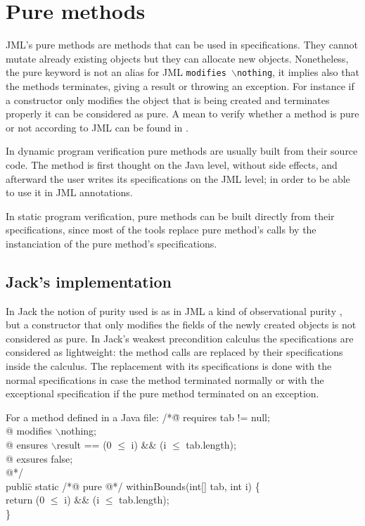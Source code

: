 \section{Pure methods}
JML's pure methods are methods that can be used in specifications.
They cannot mutate already existing objects but they can allocate new objects.
Nonetheless, the pure keyword is not an alias for JML {\tt modifies $\backslash$nothing}, 
it implies also that the methods terminates, giving a result or throwing an 
exception.
For instance if a constructor only modifies the object that is being 
created and terminates properly
it can be considered as pure.
A mean to verify whether a method is pure or not according to JML
can be found in \cite{salcianu05}. 



In dynamic program verification pure methods are usually built from their source code. 
The method is first thought on the Java level, without side effects, and afterward
the user writes its specifications on the JML level; in order to be able
to use it in JML annotations.

In static program verification,  pure methods can be built directly
from their specifications, since most of the tools replace  pure method's calls 
 by the instanciation of the pure method's specifications.


\subsection{Jack's implementation}
In Jack the notion of purity used is as in JML a kind of observational purity \cite{naumann05}, 
but a constructor that
only modifies the fields of the newly created objects is not considered 
as pure.
In Jack's weakest precondition calculus the specifications are considered 
as lightweight: the method calls are replaced by their specifications 
inside the calculus.
The replacement with its specifications is done with the normal 
specifications in case the method terminated normally or with the 
exceptional specification if the pure method terminated on an exception.
 
For a method defined in a Java file: 
\btab
 /*\=@ requires tab != null;\+\\
  @  modifies $\backslash$nothing;\\
  @ ensures   $\backslash$result == (0 $\le$ i) \&\& (i $\le$ tab.length);\\
  @ exsures false;\\
  @*/\-\\
publi\=c static /*@ pure @*/  withinBounds(int[] tab, int i) \{\+\\
       return (0 $\le$ i) \&\& (i $\le$ tab.length);\-\\
\}
\etab

